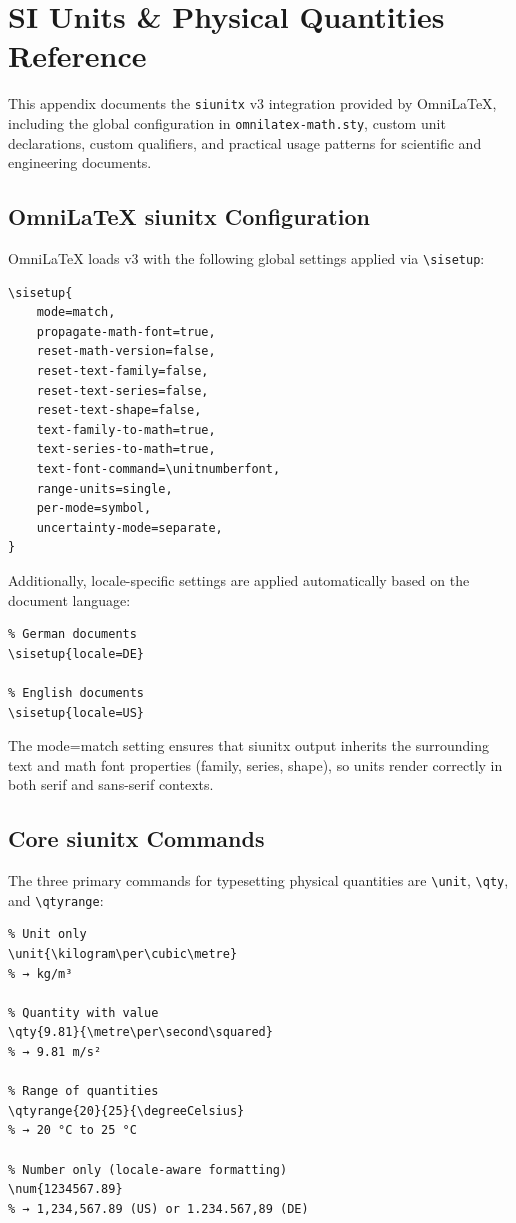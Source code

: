 \chapter{SI Units \& Physical Quantities Reference}
\label{ch:siunits}

This appendix documents the \texttt{siunitx} v3 integration provided by
OmniLaTeX, including the global configuration in
\texttt{omnilatex-math.sty}, custom unit declarations, custom qualifiers,
and practical usage patterns for scientific and engineering documents.

\section{OmniLaTeX siunitx Configuration}

OmniLaTeX loads  v3 with the following global
settings applied via \verb|\sisetup|:

\begin{verbatim}
\sisetup{
    mode=match,
    propagate-math-font=true,
    reset-math-version=false,
    reset-text-family=false,
    reset-text-series=false,
    reset-text-shape=false,
    text-family-to-math=true,
    text-series-to-math=true,
    text-font-command=\unitnumberfont,
    range-units=single,
    per-mode=symbol,
    uncertainty-mode=separate,
}
\end{verbatim}

Additionally, locale-specific settings are applied automatically based on
the document language:

\begin{verbatim}
% German documents
\sisetup{locale=DE}

% English documents
\sisetup{locale=US}
\end{verbatim}

The \textsf{mode=match} setting ensures that siunitx output inherits the
surrounding text and math font properties (family, series, shape), so units
render correctly in both serif and sans-serif contexts.

\section{Core siunitx Commands}

The three primary commands for typesetting physical quantities are
\verb|\unit|, \verb|\qty|, and \verb|\qtyrange|:

\begin{verbatim}
% Unit only
\unit{\kilogram\per\cubic\metre}
% → kg/m³

% Quantity with value
\qty{9.81}{\metre\per\second\squared}
% → 9.81 m/s²

% Range of quantities
\qtyrange{20}{25}{\degreeCelsius}
% → 20 °C to 25 °C

% Number only (locale-aware formatting)
\num{1234567.89}
% → 1,234,567.89 (US) or 1.234.567,89 (DE)
\end{verbatim}

